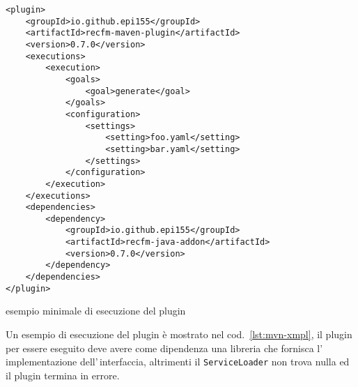\documentclass[a4paper,10pt]{report}
\newif\ifesource
\newenvironment{elisting}[1][!htb]
  {\captionsetup{aboveskip=0pt}\begin{listing}[#1]}
  {\end{listing}%
}
\begin{document}

\ifesource
\begin{figure*}[!htb]
\begin{lstlisting}[language=XML, caption=esempio minimale di esecuzione del 
plugin, label=lst:mvn-xmpl]
<plugin>
    <groupId>io.github.epi155</groupId>
    <artifactId>recfm-maven-plugin</artifactId>
    <version>0.7.0</version>
    <executions>
        <execution>
            <goals>
                <goal>generate</goal>
            </goals>
            <configuration>
                <settings>
                    <setting>foo.yaml</setting>
                    <setting>bar.yaml</setting>
                </settings>
            </configuration>
        </execution>
    </executions>
    <dependencies>
        <dependency>
            <groupId>io.github.epi155</groupId>
            <artifactId>recfm-java-addon</artifactId>
            <version>0.7.0</version>
        </dependency>
    </dependencies>
</plugin>
\end{lstlisting}
\end{figure*}
\else
\begin{elisting}
\begin{verbatim}
<plugin>
    <groupId>io.github.epi155</groupId>
    <artifactId>recfm-maven-plugin</artifactId>
    <version>0.7.0</version>
    <executions>
        <execution>
            <goals>
                <goal>generate</goal>
            </goals>
            <configuration>
                <settings>
                    <setting>foo.yaml</setting>
                    <setting>bar.yaml</setting>
                </settings>
            </configuration>
        </execution>
    </executions>
    <dependencies>
        <dependency>
            <groupId>io.github.epi155</groupId>
            <artifactId>recfm-java-addon</artifactId>
            <version>0.7.0</version>
        </dependency>
    </dependencies>
</plugin>
\end{verbatim}
\caption{esempio minimale di esecuzione del plugin}
\label{lst:mvn-xmpl}
\end{elisting}
\fi
Un esempio di esecuzione del plugin è mostrato nel cod.~\ref{lst:mvn-xmpl},
il plugin per essere eseguito deve avere come dipendenza una libreria che 
fornisca l'\,implementazione dell'\,inter\-fac\-cia, altrimenti il 
\verb!ServiceLoader! non trova nulla ed il plugin termina in errore.
\end{document}
